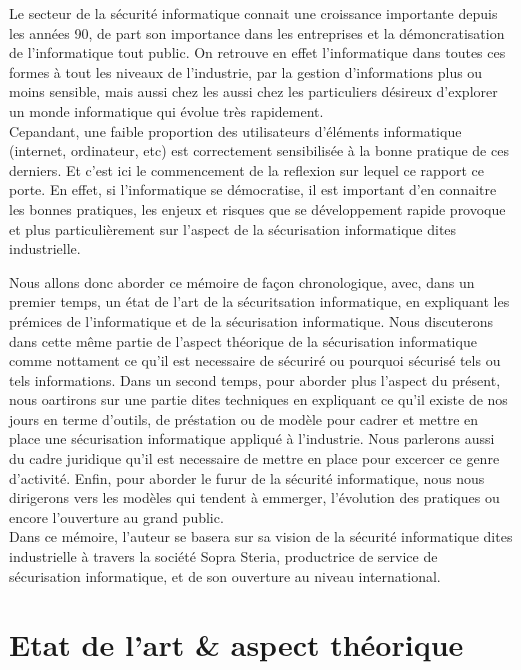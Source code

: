 \documentclass[a4paper]{memoir}
\begin{document}
Le secteur de la sécurité informatique connait une croissance importante depuis les années 90, de part son importance dans les entreprises et la démoncratisation de l'informatique tout public. On retrouve en effet l'informatique dans toutes ces formes à tout les niveaux de l'industrie, par la gestion d'informations plus ou moins sensible, mais aussi chez les aussi chez les particuliers désireux d'explorer un monde informatique qui évolue très rapidement.\\

Cepandant, une faible proportion des utilisateurs d'éléments informatique (internet, ordinateur, etc) est correctement sensibilisée à la bonne pratique de ces derniers. Et c'est ici le commencement de la reflexion sur lequel ce rapport ce porte. En effet, si l'informatique se démocratise, il est important d'en connaitre les bonnes pratiques, les enjeux et risques que se développement rapide provoque et plus particulièrement sur l'aspect de la sécurisation informatique dites industrielle.

Nous allons donc aborder ce mémoire de façon chronologique, avec, dans un premier temps, un état de l'art de la sécuritsation informatique, en expliquant les prémices de l'informatique et de la sécurisation informatique. Nous discuterons dans cette même partie de l'aspect théorique de la sécurisation informatique comme nottament ce qu'il est necessaire de sécuriré ou pourquoi sécurisé tels ou tels informations.
Dans un second temps, pour aborder plus l'aspect du présent, nous oartirons sur une partie dites techniques en expliquant ce qu'il existe de nos jours en terme d'outils, de préstation ou de modèle pour cadrer et mettre en place une sécurisation informatique appliqué à l'industrie. Nous parlerons aussi du cadre juridique qu'il est necessaire de mettre en place pour excercer ce genre d'activité. Enfin, pour aborder le furur de la sécurité informatique, nous nous dirigerons vers les modèles qui tendent à emmerger, l'évolution des pratiques ou encore l'ouverture au grand public.\\

Dans ce mémoire, l'auteur se basera sur sa vision de la sécurité informatique dites industrielle à travers la société Sopra Steria, productrice de service de sécurisation informatique, et de son ouverture au niveau international.



\part{Etat de l'art \& aspect théorique}
\end{document}
